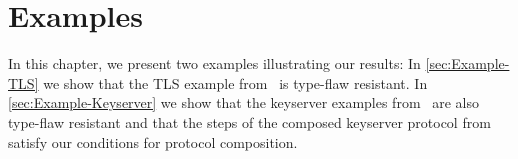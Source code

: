 \documentclass[10pt,DIV16,a4paper,abstract=true,twoside=semi,openright]
{scrreprt}
\begin{document}
\chapter{Examples}
\label{cha:examples}
In this chapter, we present two examples illustrating our results:
In \autoref{sec:Example-TLS} we show that the TLS example from~\cite{hess.ea:formalizing:2017} is type-flaw resistant.
In \autoref{sec:Example-Keyserver} we show that the keyserver examples from~\cite{hess.ea:typing:2018,hess.ea:stateful:2018} are also type-flaw resistant and that the steps of the composed keyserver protocol from~\cite{hess.ea:stateful:2018} satisfy our conditions for protocol composition. 



{\small
  
  
}
\end{document}
